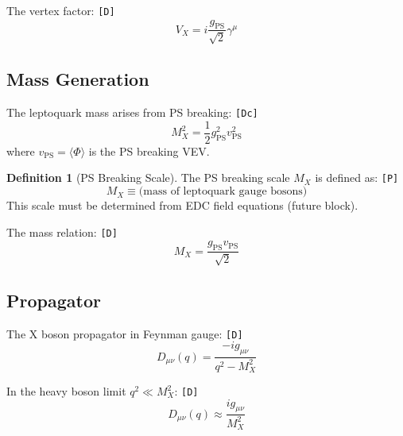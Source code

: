 \documentclass[11pt,a4paper]{article}
\newcommand{\tagD}{\textcolor{green!50!black}{\texttt{[D]}}}
\newcommand{\tagDc}{\textcolor{blue!70!black}{\texttt{[Dc]}}}
\newcommand{\tagP}{\textcolor{orange!80!black}{\texttt{[P]}}}
\theoremstyle{definition}
\newtheorem{definition}{Definition}[section]
\begin{document}
The vertex factor: \tagD{}
\begin{equation}
\label{eq:vertex-factor}
V_X = i \frac{g_{\text{PS}}}{\sqrt{2}} \gamma^\mu
\end{equation}

\subsection{Mass Generation}
\label{subsec:x-mass}

The leptoquark mass arises from PS breaking: \tagDc{}
\begin{equation}
\label{eq:x-mass}
\boxed{M_X^2 = \frac{1}{2} g_{\text{PS}}^2 v_{\text{PS}}^2}
\end{equation}
where $v_{\text{PS}} = \langle \Phi \rangle$ is the PS breaking VEV.

\begin{definition}[PS Breaking Scale]
\label{def:mx-scale}
The PS breaking scale $M_X$ is defined as: \tagP{}
\begin{equation}
\label{eq:mx-definition}
M_X \equiv \text{(mass of leptoquark gauge bosons)}
\end{equation}
This scale must be determined from EDC field equations (future block).
\end{definition}

The mass relation: \tagD{}
\begin{equation}
\label{eq:mx-vps}
M_X = \frac{g_{\text{PS}} v_{\text{PS}}}{\sqrt{2}}
\end{equation}

\subsection{Propagator}
\label{subsec:propagator}

The X boson propagator in Feynman gauge: \tagD{}
\begin{equation}
\label{eq:x-propagator}
D_{\mu\nu}(q) = \frac{-i g_{\mu\nu}}{q^2 - M_X^2}
\end{equation}

In the heavy boson limit $q^2 \ll M_X^2$: \tagD{}
\begin{equation}
\label{eq:x-propagator-heavy}
D_{\mu\nu}(q) \approx \frac{i g_{\mu\nu}}{M_X^2}
\end{equation}

\end{document}
